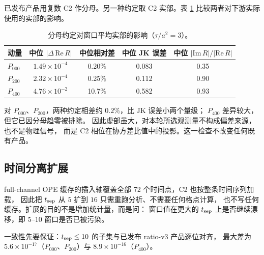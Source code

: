 \documentclass[UTF8,a4paper,11pt]{ctexart}
\begin{document}
已发布产品用复数 C2 作分母。另一种约定取 C2 实部。表 \ref{tab:denom}
比较两者对下游实际使用的实部的影响。

\begin{table}[htbp]
\centering
\caption{分母约定对窗口平均实部的影响（$\tau/a^2=3$）。}
\label{tab:denom}
\footnotesize
\begin{tabular}{@{}lcccc@{}}
\toprule
动量 & 中位 $|\Delta\,\mathrm{Re}\,R|$ & 中位相对差 & 中位 JK 误差
 & 中位 $|\mathrm{Im}\,R|/|\mathrm{Re}\,R|$ \\
\midrule
$P_{000}$ & $1.49\times10^{-4}$ & 0.20\% & 0.083 & 0.35 \\
$P_{200}$ & $2.32\times10^{-4}$ & 0.25\% & 0.112 & 0.90 \\
$P_{400}$ & $4.76\times10^{-2}$ & 10.7\%  & 0.582 & 0.93 \\
\bottomrule
\end{tabular}
\end{table}

对 $P_{000}$、$P_{200}$，两种约定相差约 $0.2\%$，比 JK 误差小两个量级；
$P_{400}$ 差异较大，但它已因分母趋零被排除。
因此虚部虽大，对本轮所选观测量不构成偏差来源，也不是物理信号，
而是 C2 相位在协方差比值中的投影。这一检查不改变任何既有产品。

\subsection{时间分离扩展}

full-channel OPE 缓存的插入轴覆盖全部 72 个时间点，C2 也按整条时间序列加载，
因此把 $t_{\rm sep}$ 从 $5$ 扩到 $16$ 只需重跑分析、不需要任何格点计算，
也不写任何缓存。扩展的目的不是增加统计量，而是问：
窗口值在更大的 $t_{\rm sep}$ 上是否继续漂移，即 $5$--$10$ 窗口是否已被污染。

一致性先要保证：$t_{\rm sep}\le10$ 的子集与已发布 ratio-v3 产品逐位对齐，
最大差为 $5.6\times10^{-17}$（$P_{000}$、$P_{200}$）与
$8.9\times10^{-16}$（$P_{400}$）。
\end{document}
